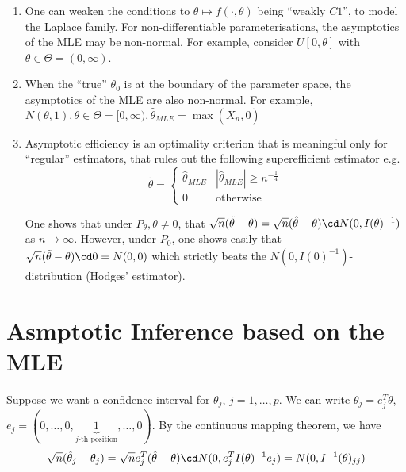 \begin{remark}
  \begin{enumerate}
  \item One can weaken the conditions to $\theta \mapsto f(\cdot,
    \theta)$ being ``weakly $C1$'', to model the Laplace family. For
    non-differentiable parameterisations, the asymptotics of the MLE
    may be non-normal. For example, consider $U[0, \theta]$ with
    $\theta \in \Theta = (0, \infty)$.
  \item When the ``true'' $\theta_{0}$ is at the boundary of the
    parameter space, the asymptotics of the MLE are also non-normal.
    For example, $N(\theta, 1), \theta \in \Theta = [0, \infty), \hat
    \theta_{MLE} = \max(\overline{X_{n}}, 0)$
  \item Asymptotic efficiency is an optimality criterion that is
    meaningful only for ``regular'' estimators, that rules out the
    following superefficient estimator e.g.
    \begin{equation}
      \label{eq:67}
      \tilde \theta =
      \begin{cases}
        \hat \theta_{MLE} & |\hat \theta_{MLE}| \geq n^{-\frac{1}{4}} \\
        0 & \text{otherwise}
      \end{cases}
    \end{equation}

    One shows that under $P_{\theta}, \theta \neq 0$, that
    $\sqrt{n}(\tilde \theta - \theta) = \sqrt{n}(\hat \theta -
    \theta) \cd N(0, I(\theta)^{-1})$ as $n \rightarrow \infty$.
    However, under $P_{0}$, one shows easily that $\sqrt{n}(\tilde
    \theta - \theta) \cd 0 = N(0, 0)$ which strictly beats the $N(0,
    I(0)^{-1})$-distribution (Hodges' estimator).
  \end{enumerate}
\end{remark}


\section{Asmptotic Inference based on the MLE}
\label{sec:asmpt-infer-based}

Suppose we want a confidence interval for $\theta_{j}$, $j = 1, \dots,
p$.   We can write $\theta_{j} = e_{j}^{T} \theta$, $e_{j} = (0,
\dots, 0, \underbrace{1}_{\text{$j$-th position}}, \dots, 0)$.  By the
continuous mapping theorem, we have
\begin{align}
  \label{eq:68}
  \sqrt{n} (\hat \theta_{j} - \theta_{j}) = \sqrt{n} e_{j}^{T}(\hat
  \theta - \theta) \cd N(0, e_{j}^{T} I(\theta)^{-1}e_{j}) = N(0, I^{-1}(\theta)_{jj})
\end{align}



